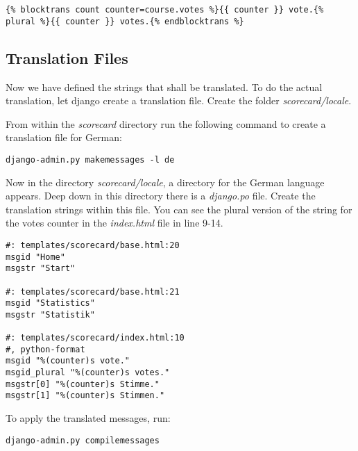 \begin{lstlisting}[style=HTML, caption=exceprt of index.html with translation, label=lst:index.html_translation]
{% blocktrans count counter=course.votes %}{{ counter }} vote.{% plural %}{{ counter }} votes.{% endblocktrans %}
\end{lstlisting}

\subsection{Translation Files}
Now we have defined the strings that shall be translated. To do the actual translation, let django create a translation file. Create the folder \emph{scorecard/locale}.

From within the \emph{scorecard} directory run the following command to create a translation file for German:

\begin{lstlisting}[style=Bash, caption=Create a German translation file, label=lst:makemessages]
django-admin.py makemessages -l de
\end{lstlisting}

Now in the directory \emph{scorecard/locale}, a directory for the German language appears. Deep down in this directory there is a \emph{django.po} file. Create the translation strings within this file. You can see the plural version of the string for the votes counter in the \emph{index.html} file in line 9-14.

\begin{lstlisting}[style=HTML, caption=django.po file for German, label=lst:django.po]
#: templates/scorecard/base.html:20
msgid "Home"
msgstr "Start"

#: templates/scorecard/base.html:21
msgid "Statistics"
msgstr "Statistik"

#: templates/scorecard/index.html:10
#, python-format
msgid "%(counter)s vote."
msgid_plural "%(counter)s votes."
msgstr[0] "%(counter)s Stimme."
msgstr[1] "%(counter)s Stimmen."
\end{lstlisting}

To apply the translated messages, run:
\begin{lstlisting}[style=Bash, caption=Compile messages, label=lst:compilemessages]
django-admin.py compilemessages
\end{lstlisting}